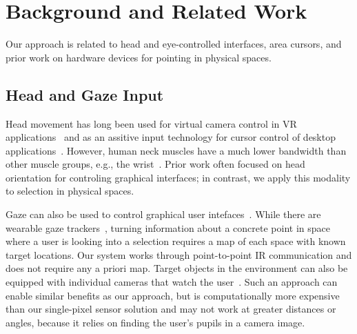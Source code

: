 \section{Background and Related Work}
Our approach is related to head and eye-controlled interfaces, area cursors, and prior work on hardware devices for pointing in physical spaces.
\subsection{Head and Gaze Input}
Head movement has long been used for virtual camera control in VR applications~\cite{pausch_user_1993} and as an assitive input technology for cursor control of desktop applications~\cite{radwin1990method}. However, human neck muscles have a much lower bandwidth than other muscle groups, e.g., the wrist~\cite{card_morphological_1991}.
Prior work often focused on head orientation for controling graphical interfaces; in contrast, we apply this modality to selection in physical spaces.

Gaze can also be used to control graphical user intefaces~\cite{kumar2007eyepoint}. While there are wearable gaze trackers~\cite{bulling2009wearable}, turning information about a concrete point in space where a user is looking into a selection requires a map of each space with known target locations. Our system works through point-to-point IR communication and does not require any a priori map. Target objects in the environment can also be equipped with individual cameras that watch the user~\cite{smith2013gaze,vertegaal2005media}. Such an approach can enable similar benefits as our approach, but is computationally more expensive than our single-pixel sensor solution and may not work at greater distances or angles, because it relies on finding the user's pupils in a camera image.

